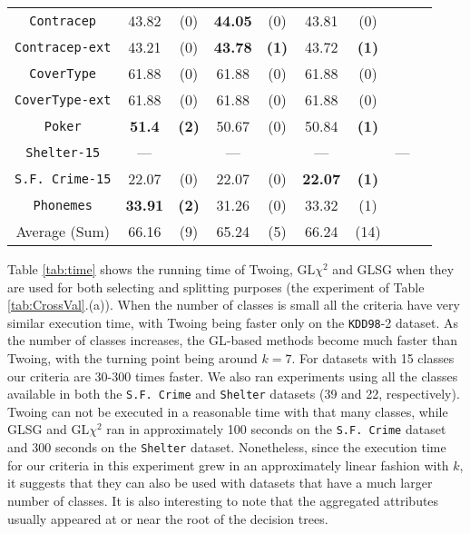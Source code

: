 \begin{table}
\begin{tabular}{c|cc|cc|cc|cc}
{\tt Contracep}     &43.82       &  (0)              &   {\bf 44.05}& (0)             &  43.81      &  (0)                 &             &                \\
{\tt Contracep-ext} &43.21       &  (0)              &   {\bf 43.78}& {\bf (1)}       &  43.72      &  {\bf (1)}           &             &                \\
{\tt CoverType}     &61.88       &  (0)              &   61.88      & (0)             &  61.88      &  (0)                 &             &                \\
{\tt CoverType-ext} &61.88       &  (0)              &   61.88      & (0)             &  61.88      &  (0)                 &             &                \\
{\tt Poker}         &{\bf 51.4}  &  {\bf (2)}        &   50.67      & (0)             &  50.84      &  {\bf (1)}           &             &                \\
{\tt Shelter-15}    &---         &                   &   ---        &                 &   ---       &                      & ---         &                \\
{\tt S.F. Crime-15} &22.07       &  (0)              &  22.07       & (0)             & {\bf 22.07} &  {\bf (1)}           &             &                \\
{\tt Phonemes}      & {\bf 33.91}&  {\bf (2)}        & 31.26        &  (0)            &  33.32      &  (1)                 &             &                \\
\hline
Average (Sum)       & 66.16      &  (9)              & 65.24        & (5)             &  66.24      & (14)                 &             &
       \end{tabular}
\normalsize
\label{tab:CrossVal-b}
\end{table}


Table \ref{tab:time} shows the running time of Twoing, GL$\chi^2$ and GLSG  when
they are used for both selecting and splitting purposes (the experiment of Table \ref{tab:CrossVal}.(a)).
When the number of classes is small all the criteria have very similar execution time, with Twoing being faster only on the {\tt KDD98}-2 dataset. As the number of classes increases, the GL-based methods become much faster than Twoing, with the turning point being around $k=7$. For datasets with 15 classes our criteria are 30-300 times faster. We also ran experiments using all the classes available in both the {\tt S.F. Crime} and {\tt Shelter} datasets (39 and 22, respectively). Twoing can not be executed in a reasonable time with that many classes, while GLSG and GL$\chi^2$ ran in approximately 100 seconds on the {\tt S.F. Crime} dataset and  300 seconds on the {\tt Shelter} dataset. Nonetheless, since the execution time for our criteria in this experiment grew in an approximately linear fashion with $k$, it suggests that they can also be used with datasets that have a much larger number of classes. It is also interesting to note that the aggregated attributes usually appeared at or near the root of the decision trees.


